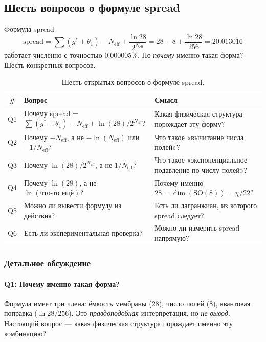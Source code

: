 \documentclass[11pt,a4paper]{article}
\newcommand{\SO}{\ensuremath{\mathrm{SO}}}
\theoremstyle{definition}
\begin{document}
\subsection{Шесть вопросов о формуле spread}
\label{subsec:open-spread-questions}

Формула spread
\begin{equation}
    \text{spread} = \sum(g^* + \theta_1) - N_{\text{eff}}
    + \frac{\ln 28}{2^{N_{\text{eff}}}}
    = 28 - 8 + \frac{\ln 28}{256} = 20.013016
\end{equation}
работает численно с точностью $0.000005\%$. Но \emph{почему}
именно такая форма? Шесть конкретных вопросов.

\begin{table}[ht]
\centering
\caption{Шесть открытых вопросов о формуле spread.}
\label{tab:six-questions}
\begin{tabular}{clp{6cm}}
\toprule
\# & Вопрос & Смысл \\
\midrule
Q1 & Почему spread = $\sum(g^* + \theta_1) - N_{\text{eff}}
    + \ln(28)/2^{N_{\text{eff}}}$?
   & Какая физическая структура порождает эту форму? \\[0.3em]
Q2 & Почему $- N_{\text{eff}}$, а не $-\ln(N_{\text{eff}})$
    или $- 1/N_{\text{eff}}$?
   & Что такое «вычитание числа полей»? \\[0.3em]
Q3 & Почему $\ln(28)/2^{N_{\text{eff}}}$, а не $1/N_{\text{eff}}$?
   & Что такое «экспоненциальное подавление по числу полей»? \\[0.3em]
Q4 & Почему $\ln(28)$, а не $\ln(\text{что-то ещё})$?
   & Почему именно $28 = \dim(\SO(8)) = \chi/22$? \\[0.3em]
Q5 & Можно ли вывести формулу из действия?
   & Есть ли лагранжиан, из которого spread следует? \\[0.3em]
Q6 & Есть ли экспериментальная проверка?
   & Можно ли измерить spread напрямую? \\
\bottomrule
\end{tabular}
\end{table}

\subsubsection{Детальное обсуждение}

\paragraph{Q1: Почему именно такая форма?}
Формула имеет три члена: ёмкость мембраны (28),
число полей (8), квантовая поправка ($\ln 28/256$).
Это \emph{правдоподобная} интерпретация, но \emph{не вывод}.
Настоящий вопрос --- какая физическая структура порождает
именно эту комбинацию?
\end{document}
